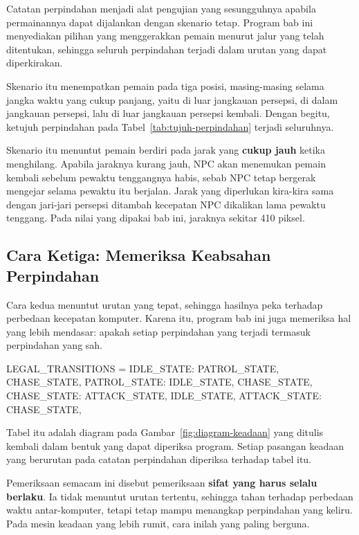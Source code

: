 Catatan perpindahan menjadi alat pengujian yang sesungguhnya apabila
permainannya dapat dijalankan dengan skenario tetap. Program bab ini
menyediakan pilihan  yang menggerakkan pemain menurut jalur
yang telah ditentukan, sehingga seluruh perpindahan terjadi dalam urutan yang
dapat diperkirakan.

Skenario itu menempatkan pemain pada tiga posisi, masing-masing selama jangka
waktu yang cukup panjang, yaitu di luar jangkauan persepsi, di dalam jangkauan
persepsi, lalu di luar jangkauan persepsi kembali. Dengan begitu, ketujuh
perpindahan pada Tabel~\ref{tab:tujuh-perpindahan} terjadi seluruhnya.

\begin{catatabox}
Skenario itu menuntut pemain berdiri pada jarak yang
\textbf{cukup jauh} ketika menghilang. Apabila jaraknya kurang jauh, NPC akan
menemukan pemain kembali sebelum pewaktu tenggangnya habis, sebab NPC tetap
bergerak mengejar selama pewaktu itu berjalan. Jarak yang diperlukan kira-kira
sama dengan jari-jari persepsi ditambah kecepatan NPC dikalikan lama pewaktu
tenggang. Pada nilai yang dipakai bab ini, jaraknya sekitar 410 piksel.
\end{catatabox}

\subsection{Cara Ketiga: Memeriksa Keabsahan Perpindahan}

Cara kedua menuntut urutan yang tepat, sehingga hasilnya peka terhadap
perbedaan kecepatan komputer. Karena itu, program bab ini juga memeriksa hal
yang lebih mendasar: apakah setiap perpindahan yang terjadi termasuk
perpindahan yang sah.

\begin{kodekeluaran}
LEGAL_TRANSITIONS = {
    IDLE_STATE:   {PATROL_STATE, CHASE_STATE},
    PATROL_STATE: {IDLE_STATE, CHASE_STATE},
    CHASE_STATE:  {ATTACK_STATE, IDLE_STATE},
    ATTACK_STATE: {CHASE_STATE},
}
\end{kodekeluaran}

Tabel itu adalah diagram pada Gambar~\ref{fig:diagram-keadaan} yang ditulis
kembali dalam bentuk yang dapat diperiksa program. Setiap pasangan keadaan yang
berurutan pada catatan perpindahan diperiksa terhadap tabel itu.

Pemeriksaan semacam ini disebut pemeriksaan \textbf{sifat yang harus selalu
berlaku}. Ia tidak menuntut urutan tertentu, sehingga tahan terhadap perbedaan
waktu antar-komputer, tetapi tetap mampu menangkap perpindahan yang keliru.
Pada mesin keadaan yang lebih rumit, cara inilah yang paling berguna.

